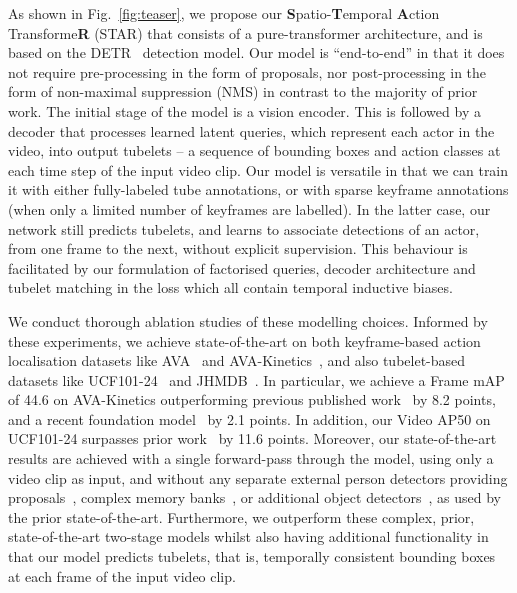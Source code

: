 \documentclass[10pt,twocolumn,letterpaper]{article}
\begin{document}
As shown in Fig.~\ref{fig:teaser}, we propose our {\bf S}patio-{\bf T}emporal {\bf A}ction Transforme{\bf R} (STAR) that consists of a pure-transformer architecture, and is based on the DETR~\cite{carion_eccv_2020} detection model.
Our model is ``end-to-end'' in that it does not require pre-processing in the form of proposals, nor post-processing in the form of non-maximal suppression (NMS) in contrast to the majority of prior work.
The initial stage of the model is a vision encoder.
This is followed by a decoder that processes learned latent queries, which represent each actor in the video, into output tubelets -- a sequence of bounding boxes and action classes at each time step of the input video clip.
Our model is versatile in that we can train it with either fully-labeled tube annotations, or with sparse keyframe annotations (when only a limited number of keyframes are labelled).
In the latter case, our network still predicts tubelets, and learns to associate detections of an actor, from one frame to the next, without explicit supervision.
This behaviour is facilitated by our formulation of factorised queries, decoder architecture and tubelet matching in the loss which all contain temporal inductive biases.

We conduct thorough ablation studies of these modelling choices. Informed by these experiments, we achieve state-of-the-art on both keyframe-based action localisation datasets like AVA~\cite{gu_cvpr_2018} and AVA-Kinetics~\cite{li2020ava}, and also tubelet-based datasets like UCF101-24~\cite{soomro_arxiv_2012} and JHMDB~\cite{jhuang2013towards}.
In particular, we achieve a Frame mAP of 44.6 on AVA-Kinetics outperforming previous published work~\cite{pan2021actor} by 8.2 points, and a recent foundation model~\cite{wang2022internvideo} by 2.1 points. In addition, our Video AP50 on UCF101-24 surpasses prior work~\cite{zhao2022tuber} by 11.6 points.
Moreover, our state-of-the-art results are achieved with a single forward-pass through the model, using only a video clip as input, and without any separate external person detectors providing proposals~\cite{wu2022memvit,wang2022internvideo, arnab2022beyond}, complex memory banks~\cite{wu2022memvit,zhao2022tuber,pan2021actor}, or additional object detectors~\cite{tang2020asynchronous,arnab2021unified}, as used by the prior state-of-the-art.
Furthermore, we outperform these complex, prior, state-of-the-art two-stage models whilst also having additional functionality in that our model predicts tubelets, that is, temporally consistent bounding boxes at each frame of the input video clip. 
\end{document}
